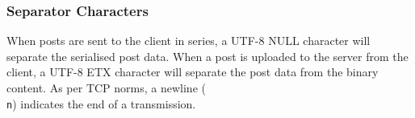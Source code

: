\documentclass[12pt, a4paper]{article}
\begin{document}
\subsubsection{Separator Characters}
When posts are sent to the client in series, a UTF-8 NULL character will separate the serialised post data. When a post is uploaded to the server from the client, a UTF-8 ETX character will separate the post data from the binary content. As per TCP norms, a newline (\texttt{\\n}) indicates the end of a transmission.

\clearpage
\end{document}
